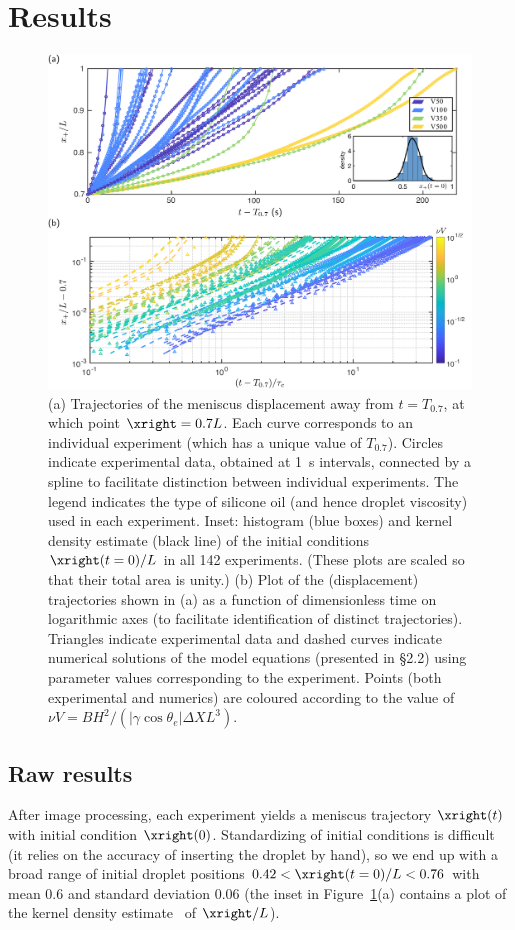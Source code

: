 \section{Results}
\begin{figure}[h!]
\centering
\includegraphics[scale=0.39]{ExptsFigV3}
\caption{(a) Trajectories of the meniscus displacement away from $t = T_{0.7}$, at which point $\xright = 0.7L$. Each curve corresponds to an individual experiment (which has a unique value of $T_{0.7}$). Circles indicate experimental data, obtained at 1~s intervals, connected by a spline to facilitate distinction between individual experiments. The legend indicates the type of silicone oil (and hence droplet viscosity) used in each experiment. Inset: histogram (blue boxes) and kernel density estimate (black line) of the initial conditions $\xright(t=0)/L$ in all 142 experiments. (These plots are scaled so that their total area is unity.) (b) Plot of the (displacement) trajectories shown in (a) as a function of dimensionless time on logarithmic axes (to facilitate identification of distinct trajectories). Triangles indicate experimental data and dashed curves indicate numerical solutions of the model equations (presented in \S2.2) using parameter values corresponding to the experiment. Points (both experimental and numerics) are coloured according to the value of $\nu V = BH^2 / (|\gamma \cos \theta_e|\Delta X L^3)$.}\label{fig:Ch3:ExptRawAndScaledTraces}
\end{figure}


\subsection{Raw results}
After image processing, each experiment yields a meniscus trajectory $\xright(t)$ with initial condition $\xright(0)$. Standardizing of initial conditions is difficult (it relies on the accuracy of inserting the droplet by hand), so we end up with a broad range of initial droplet positions $0.42 <\xright(t = 0)/L < 0.76$ with mean 0.6 and standard deviation 0.06 (the inset in Figure~\ref{fig:Ch3:ExptRawAndScaledTraces}(a) contains a plot of the kernel density estimate~\citep{Sheather2004StatSci} of $\xright/L$).

